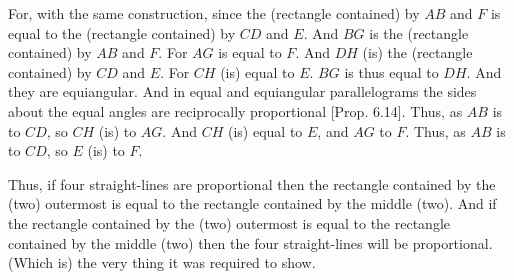 \begin{Parallel}{}{}
{For,  with the same construction, since the (rectangle contained) by $AB$ and $F$
is equal to the (rectangle contained) by $CD$ and $E$. And $BG$ is the (rectangle
contained) by $AB$ and $F$. For $AG$ is equal to $F$. And $DH$ (is) the
(rectangle contained) by $CD$ and $E$. For $CH$ (is) equal to $E$. $BG$ is thus
equal to $DH$. And they are equiangular.  And in equal and equiangular parallelograms  the sides about the equal angles are reciprocally
proportional [Prop. 6.14]. Thus, as $AB$
is to $CD$, so $CH$ (is) to $AG$. And $CH$ (is) equal to $E$, and $AG$ to $F$.
Thus, as $AB$  is to $CD$, so $E$ (is) to $F$.

Thus, if four straight-lines are proportional then the
rectangle contained by the (two) outermost is equal to the rectangle contained
by the middle (two). And if the rectangle contained by the (two) outermost
is
equal to the rectangle contained by the middle (two) then the four straight-lines
will be proportional. (Which is) the very thing it was required to show.}
\end{Parallel}


